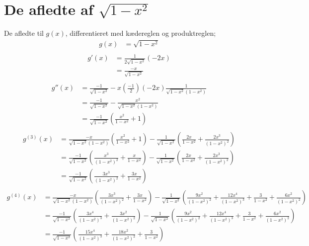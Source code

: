 \chapter{De afledte af $\sqrt{1-x^2}$}
\label{app:afledte}
De afledte til $g(x)$, differentieret med kædereglen og produktreglen;
\begin{align*}
g(x) &= \sqrt{1-x^2} \\
\end{align*}
\begin{align*}
g'(x) &= \frac{1}{2\sqrt{1-x^2}} (-2x)\\
&= \frac{-x}{\sqrt{1-x^2}} \\
\end{align*}
\begin{align*}
g''(x) &= \frac{-1}{\sqrt{1-x^2}} -x\left(\frac{-1}{2}\right)(-2x)\frac{1}{\sqrt{1-x^2}(1-x^2)}\\
&= \frac{-1}{\sqrt{1-x^2}} -\frac{x^2}{\sqrt{1-x^2}(1-x^2)}\\
&= \frac{-1}{\sqrt{1-x^2}}\left(\frac{x^2}{1-x^2}+1\right)\\
\end{align*}
\begin{align*}
g^{(3)}(x) &= \frac{-x}{\sqrt{1-x^2}(1-x^2)}\left(\frac{x^2}{1-x^2}+1\right)- \frac{1}{\sqrt{1-x^2}}\left(\frac{2x}{1-x^2}+\frac{2x^3}{(1-x^2)^2}\right)\\
&= \frac{-1}{\sqrt{1-x^2}}\left(\frac{x^3}{(1-x^2)^2}+\frac{x}{1-x^2}\right)- \frac{1}{\sqrt{1-x^2}}\left(\frac{2x}{1-x^2}+\frac{2x^3}{(1-x^2)^2}\right)\\
&=\frac{-1}{\sqrt{1-x^2}}\left(\frac{3x^3}{(1-x^2)^2}+\frac{3x}{1-x^2}\right) \\
\end{align*}
\begin{align*}
g^{(4)}(x) &= \frac{-x}{\sqrt{1-x^2}(1-x^2)}\left(\frac{3x^3}{(1-x^2)^2}+\frac{3x}{1-x^2}\right)-\frac{1}{\sqrt{1-x^2}}\left(\frac{9x^2}{(1-x^2)^2}+\frac{12x^4}{(1-x^2)^3}+\frac{3}{1-x^2}+\frac{6x^2}{(1-x^2)^2}\right) \\
&= \frac{-1}{\sqrt{1-x^2}}\left(\frac{3x^4}{(1-x^2)^3}+\frac{3x^2}{(1-x^2)^2}\right)-\frac{1}{\sqrt{1-x^2}}\left(\frac{9x^2}{(1-x^2)^2}+\frac{12x^4}{(1-x^2)^3}+\frac{3}{1-x^2}+\frac{6x^2}{(1-x^2)^2}\right) \\
&= \frac{-1}{\sqrt{1-x^2}} \left(\frac{15x^4}{(1-x^2)^3}+\frac{18x^2}{(1-x^2)^2}+\frac{3}{1-x^2}\right)\\
\end{align*}